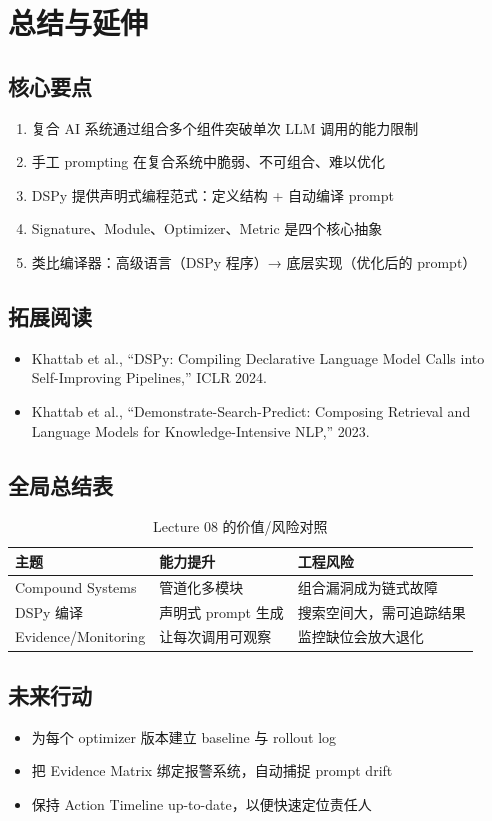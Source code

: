 \documentclass[a4paper]{article}
\begin{document}
\section{总结与延伸}

\subsection{核心要点}

\begin{enumerate}
    \item 复合 AI 系统通过组合多个组件突破单次 LLM 调用的能力限制
    \item 手工 prompting 在复合系统中脆弱、不可组合、难以优化
    \item DSPy 提供声明式编程范式：定义结构 + 自动编译 prompt
    \item Signature、Module、Optimizer、Metric 是四个核心抽象
    \item 类比编译器：高级语言（DSPy 程序）→ 底层实现（优化后的 prompt）
\end{enumerate}

\subsection{拓展阅读}

\begin{itemize}
    \item Khattab et al., ``DSPy: Compiling Declarative Language Model Calls into Self-Improving Pipelines,'' ICLR 2024.
    \item Khattab et al., ``Demonstrate-Search-Predict: Composing Retrieval and Language Models for Knowledge-Intensive NLP,'' 2023.
\end{itemize}

\subsection{全局总结表}

\begin{table}[H]
\centering
\begin{tabular}{p{}p{}p{}}
\toprule
主题 & 能力提升 & 工程风险 \\
\midrule
Compound Systems & 管道化多模块 & 组合漏洞成为链式故障 \\
DSPy 编译 & 声明式 prompt 生成 & 搜索空间大，需可追踪结果 \\
Evidence/Monitoring & 让每次调用可观察 & 监控缺位会放大退化 \\
\bottomrule
\end{tabular}
\caption{Lecture 08 的价值/风险对照}
\end{table}

\subsection{未来行动}

\begin{itemize}
    \item 为每个 optimizer 版本建立 baseline 与 rollout log
    \item 把 Evidence Matrix 绑定报警系统，自动捕捉 prompt drift
    \item 保持 Action Timeline up-to-date，以便快速定位责任人
\end{itemize}
\end{document}
